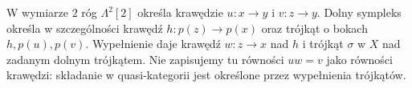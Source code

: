 \begin{center}
\end{center}
W wymiarze $2$ róg $\Lambda^2[2]$ określa krawędzie $u:x\to y$ i $v:z\to y$. Dolny sympleks określa w szczególności krawędź $h:p(z)\to p(x)$ oraz trójkąt o bokach $h,p(u),p(v)$. Wypełnienie daje krawędź $w:z\to x$ nad $h$ i trójkąt $\sigma$ w $X$ nad zadanym dolnym trójkątem. Nie zapisujemy tu równości $uw=v$ jako równości krawędzi: składanie w quasi-kategorii jest określone przez wypełnienia trójkątów.

